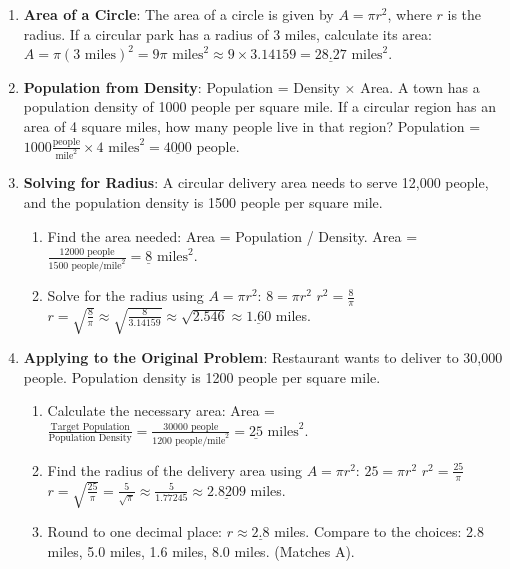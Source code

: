\documentclass[12pt]{article}
\begin{document}
\begin{enumerate}[label=13.\arabic*]
    \item \textbf{Area of a Circle}: The area of a circle is given by \( A = \pi r^2 \), where \(r\) is the radius.
    If a circular park has a radius of 3 miles, calculate its area:
    \( A = \pi (3 \text{ miles})^2 = 9\pi \text{ miles}^2 \approx 9 \times 3.14159 = \underline{28.27} \text{ miles}^2 \).
    \item \textbf{Population from Density}: Population = Density \( \times \) Area.
    A town has a population density of 1000 people per square mile. If a circular region has an area of 4 square miles, how many people live in that region?
    Population = \( 1000 \frac{\text{people}}{\text{mile}^2} \times 4 \text{ miles}^2 = \underline{4000} \) people.
    \item \textbf{Solving for Radius}: A circular delivery area needs to serve 12,000 people, and the population density is 1500 people per square mile.
    \begin{enumerate}[label=\alph*)]
        \item Find the area needed: Area = Population / Density.
        Area = \( \frac{12000 \text{ people}}{1500 \text{ people/mile}^2} = \underline{8} \text{ miles}^2 \).
        \item Solve for the radius using \( A = \pi r^2 \):
        \( 8 = \pi r^2 \)
        \( r^2 = \frac{8}{\pi} \)
        \( r = \sqrt{\frac{8}{\pi}} \approx \sqrt{\frac{8}{3.14159}} \approx \sqrt{2.546} \approx \underline{1.60} \) miles.
    \end{enumerate}
    \item \textbf{Applying to the Original Problem}: Restaurant wants to deliver to 30,000 people. Population density is 1200 people per square mile.
    \begin{enumerate}[label=\alph*)]
        \item Calculate the necessary area:
        Area = \( \frac{\text{Target Population}}{\text{Population Density}} = \frac{30000 \text{ people}}{1200 \text{ people/mile}^2} = \underline{25} \text{ miles}^2 \).
        \item Find the radius of the delivery area using \( A = \pi r^2 \):
        \( 25 = \pi r^2 \)
        \( r^2 = \frac{25}{\pi} \)
        \( r = \sqrt{\frac{25}{\pi}} = \frac{5}{\sqrt{\pi}} \approx \frac{5}{1.77245} \approx \underline{2.8209} \) miles.
        \item Round to one decimal place: \( r \approx \underline{2.8} \) miles.
        Compare to the choices: 2.8 miles, 5.0 miles, 1.6 miles, 8.0 miles. (Matches A).
    \end{enumerate}
\end{enumerate}
\end{document}
